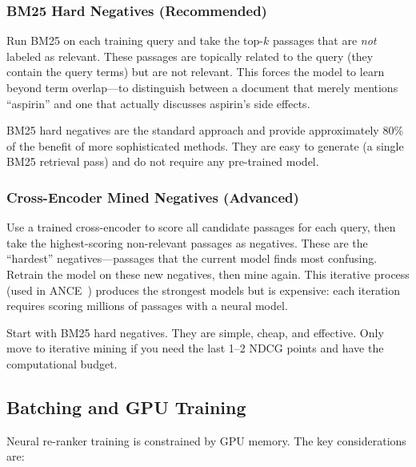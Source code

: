 \documentclass[11pt,a4paper]{article}
\theoremstyle{definition}
\theoremstyle{plain}
\begin{document}
\subsubsection{BM25 Hard Negatives (Recommended)}

Run BM25 on each training query and take the top-$k$ passages that are \emph{not} labeled as relevant. These passages are topically related to the query (they contain the query terms) but are not relevant. This forces the model to learn beyond term overlap---to distinguish between a document that merely mentions ``aspirin'' and one that actually discusses aspirin's side effects.

BM25 hard negatives are the standard approach and provide approximately 80\% of the benefit of more sophisticated methods. They are easy to generate (a single BM25 retrieval pass) and do not require any pre-trained model.

\subsubsection{Cross-Encoder Mined Negatives (Advanced)}

Use a trained cross-encoder to score all candidate passages for each query, then take the highest-scoring non-relevant passages as negatives. These are the ``hardest'' negatives---passages that the current model finds most confusing. Retrain the model on these new negatives, then mine again. This iterative process (used in ANCE~\cite{xiong2021approximate}) produces the strongest models but is expensive: each iteration requires scoring millions of passages with a neural model.

\begin{keytakeaway}
Start with BM25 hard negatives. They are simple, cheap, and effective. Only move to iterative mining if you need the last 1--2 NDCG points and have the computational budget.
\end{keytakeaway}

\subsection{Batching and GPU Training}

Neural re-ranker training is constrained by GPU memory. The key considerations are:
\end{document}
